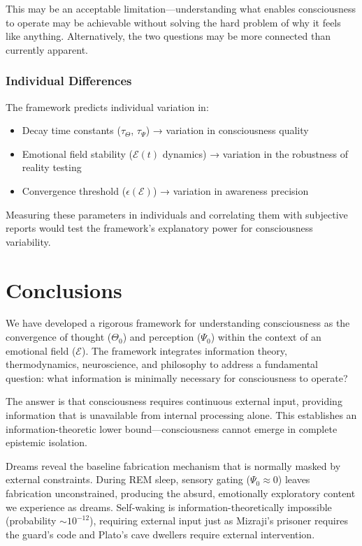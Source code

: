 \documentclass[11pt,a4paper]{article}
\begin{document}
This may be an acceptable limitation—understanding what enables consciousness to operate may be achievable without solving the hard problem of why it feels like anything. Alternatively, the two questions may be more connected than currently apparent.

\subsubsection{Individual Differences}

The framework predicts individual variation in:
\begin{itemize}
\item Decay time constants ($\tau_{\Theta}$, $\tau_{\Psi}$) → variation in consciousness quality
\item Emotional field stability ($\mathcal{E}(t)$ dynamics) → variation in the robustness of reality testing
\item Convergence threshold ($\epsilon(\mathcal{E})$) → variation in awareness precision
\end{itemize}

Measuring these parameters in individuals and correlating them with subjective reports would test the framework's explanatory power for consciousness variability.

\section{Conclusions}

We have developed a rigorous framework for understanding consciousness as the convergence of thought ($\Theta_0$) and perception ($\Psi_0$) within the context of an emotional field ($\mathcal{E}$). The framework integrates information theory, thermodynamics, neuroscience, and philosophy to address a fundamental question: what information is minimally necessary for consciousness to operate?

The answer is that consciousness requires continuous external input, providing information that is unavailable from internal processing alone. This establishes an information-theoretic lower bound—consciousness cannot emerge in complete epistemic isolation.

Dreams reveal the baseline fabrication mechanism that is normally masked by external constraints. During REM sleep, sensory gating ($\Psi_0 \approx 0$) leaves fabrication unconstrained, producing the absurd, emotionally exploratory content we experience as dreams. Self-waking is information-theoretically impossible (probability $\sim 10^{-12}$), requiring external input just as Mizraji's prisoner requires the guard's code and Plato's cave dwellers require external intervention.
\end{document}
